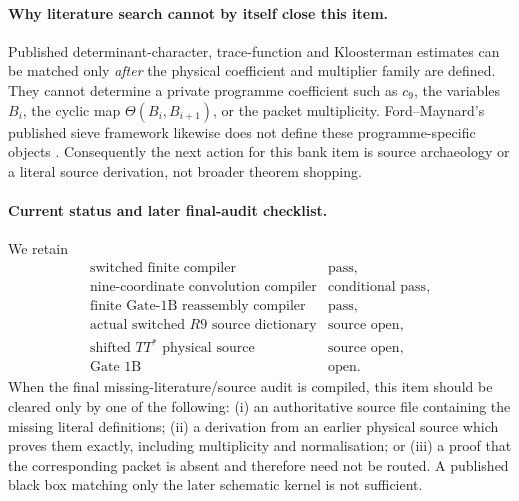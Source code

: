 \documentclass[11pt]{article}
\theoremstyle{definition}
\newcommand{\1}{\mathbf 1}
\begin{document}
\paragraph{Why literature search cannot by itself close this item.}
Published determinant-character, trace-function and Kloosterman estimates can
be matched only \emph{after} the physical coefficient and multiplier family
are defined.  They cannot determine a private programme coefficient such as
$c_9$, the variables $B_i$, the cyclic map $\Theta(B_i,B_{i+1})$, or the
packet multiplicity.  Ford--Maynard's published sieve framework likewise does
not define these programme-specific objects \cite{FordMaynard2024}.
Consequently the next action for this bank item is source archaeology or a
literal source derivation, not broader theorem shopping.

\paragraph{Current status and later final-audit checklist.}
We retain
\[
\begin{array}{ll}
 \text{switched finite compiler} & \text{pass},\\
 \text{nine-coordinate convolution compiler} & \text{conditional pass},\\
 \text{finite Gate-1B reassembly compiler} & \text{pass},\\
 \text{actual switched $R9$ source dictionary} & \text{source open},\\
 \text{shifted $TT^*$ physical source} & \text{source open},\\
 \text{Gate 1B} & \text{open}.
\end{array}
\]
When the final missing-literature/source audit is compiled, this item should
be cleared only by one of the following: (i) an authoritative source file
containing the missing literal definitions; (ii) a derivation from an earlier
physical source which proves them exactly, including multiplicity and
normalisation; or (iii) a proof that the corresponding packet is absent and
therefore need not be routed.  A published black box matching only the later
schematic kernel is not sufficient.

\printbibliography
\end{document}
